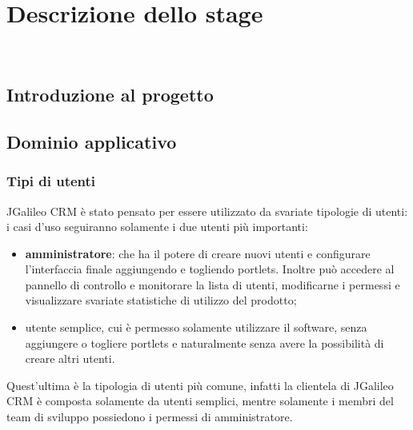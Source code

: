 
\chapter{Descrizione dello stage}
\label{cap:descrizione-stage}

\\

\section{Introduzione al progetto}

\section{Dominio applicativo}
\subsection{Tipi di utenti}
JGalileo CRM è stato pensato per essere utilizzato da svariate tipologie di utenti:
i casi d'uso seguiranno solamente i due utenti più importanti:
\begin{itemize}
	\item \textbf{amministratore}: che ha il potere di creare nuovi utenti e configurare l'interfaccia finale aggiungendo e togliendo \gls{portlets}. Inoltre può accedere al pannello di controllo e monitorare la lista di utenti, modificarne i permessi e visualizzare svariate statistiche di utilizzo del prodotto;
	\item{utente semplice}, cui è permesso solamente utilizzare il software, senza aggiungere o togliere \gls{portlets} e naturalmente senza avere la possibilità di creare altri utenti.\\
\end{itemize}
	Quest'ultima è la tipologia di utenti più comune, infatti la clientela di JGalileo CRM è composta solamente da utenti semplici, mentre solamente i membri del team di sviluppo possiedono i permessi di amministratore.
